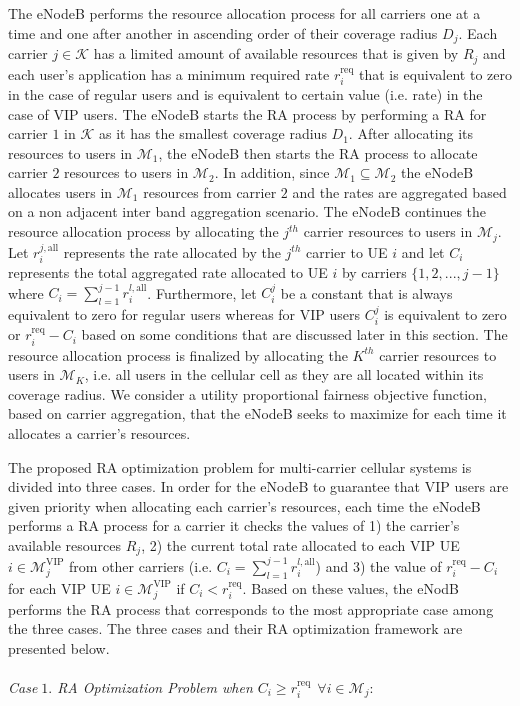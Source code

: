 \documentclass[journal]{IEEEtran} 				\IEEEoverridecommandlockouts 						\usepackage{amsmath,amssymb}
\begin{document}
The eNodeB performs the resource allocation process for all carriers one at a time and one after another in ascending order of their coverage radius $D_j$. Each carrier $j \in \mathcal{K}$ has a limited amount of available resources that is given by $R_j$ and each user's application has a minimum required rate $r_i^{\text{req}}$ that is equivalent to zero in the case of regular users and is equivalent to certain value (i.e. rate) in the case of VIP users. The eNodeB starts the RA process by performing a RA for carrier $1$ in $\mathcal{K}$ as it has the smallest coverage radius $D_1$. After allocating its resources to users in $\mathcal{M}_1$, the eNodeB then starts the RA process to allocate carrier $2$ resources to users in $\mathcal{M}_2$. In addition, since $\mathcal{M}_1 \subseteq \mathcal{M}_2$ the eNodeB allocates users in $\mathcal{M}_1$ resources from carrier $2$ and the rates are aggregated based on a non adjacent inter band aggregation scenario. The eNodeB continues the resource allocation process by allocating the $j^{th}$ carrier resources to users in $\mathcal{M}_j$. Let $r_i^{j,\text{all}}$ represents the rate allocated by the $j^{th}$ carrier to UE $i$ and let $C_i$ represents the total aggregated rate allocated to UE $i$ by carriers $\{1,2,...,j-1\}$ where $C_i=\sum_{l=1}^{j-1}r_i^{l,\text{all}}$. Furthermore, let $C_i^j$ be a constant that is always equivalent to zero for regular users whereas for VIP users $C_i^j$ is equivalent to zero or $r_i^{\text{req}}-C_i$ based on some conditions that are discussed later in this section. The resource allocation process is finalized by allocating the $K^{th}$ carrier resources to users in $\mathcal{M}_K$, i.e. all users in the cellular cell as they are all located within its coverage radius. We consider a utility proportional fairness objective function, based on carrier aggregation, that the eNodeB seeks to maximize for each time it allocates a carrier's resources.

The proposed RA optimization problem for multi-carrier cellular systems is divided into three cases. In order for the eNodeB to guarantee that VIP users are given priority when allocating each carrier's resources, each time the eNodeB performs a RA process for a carrier it checks the values of 1) the carrier's available resources $R_j$, 2) the current total rate allocated to each VIP UE $i \in \mathcal{M}_j^{\text{VIP}}$ from other carriers (i.e. $C_i=\sum_{l=1}^{j-1}r_i^{l,\text{all}}$) and 3) the value of $r_i^{\text{req}}-C_i$ for each VIP UE $i \in \mathcal{M}_j^{\text{VIP}}$ if $C_i < r_i^{\text{req}}$. Based on these values, the eNodB performs the RA process that corresponds to the most appropriate case among the three cases. The three cases and their RA optimization framework are presented below.\\
\\\textit{Case$\;1.$ RA Optimization Problem when $C_i \geq r_i^{\text{req}}\:\:\forall i \in \mathcal{M}_j$}:
\end{document}
